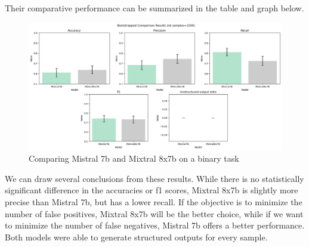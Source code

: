 \documentclass[11pt]{article}
\begin{document}
Their comparative performance can be summarized in the table and graph below.

\begin{table}[h]
    \centering
    \caption{Binary task: comparing Mistral 7b and Mixtral 8x7b}
    \label{tab:my_label}
\end{table}

\begin{figure}[h]
    \centering
    \includegraphics[width=\linewidth]{images//mistral//binary/comparison.png}
    \caption{Comparing Mistral 7b and Mixtral 8x7b on a binary task}
    \label{fig:enter-label}
\end{figure}

\newpage

We can draw several conclusions from these results. While there is no statistically significant difference in the accuracies or f1 scores, Mixtral 8x7b is slightly more precise than Mistral 7b, but has a lower recall. If the objective is to minimize the number of false positives, Mixtral 8x7b will be the better choice, while if we want to minimize the number of false negatives, Mistral 7b offers a better performance.
Both models were able to generate structured outputs for every sample.\\
\end{document}
